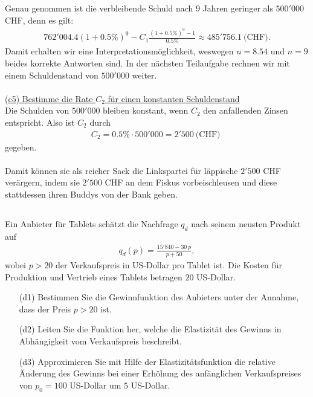 Genau genommen ist die verbleibende Schuld nach $ 9 $ Jahren geringer als $ 500'000 $ CHF, denn es gilt:
\begin{align*}
	762'004.4 (1+ 0.5 \%)^9 - C_1 \frac{(1+ 0.5 \%)^{9}  - 1}{0.5 \%}
	\approx 485'756.1 \ \textrm{(CHF)}.
\end{align*}
Damit erhalten wir eine Interpretationsmöglichkeit, weswegen $ n = 8.54 $ und $ n  = 9 $ beides korrekte Antworten sind. In der nächsten Teilaufgabe rechnen wir mit einem Schuldenstand von $ 500'000 $ weiter.\\
\\
\underline{(c5) Bestimme die Rate $ C_2 $ für einen konstanten Schuldenstand}\\
Die Schulden von $ 500'000 $ bleiben konstant, wenn $ C_2 $ den anfallenden Zinsen entspricht. Also ist $ C_2 $ durch 
\begin{align*}
	C_2=  0.5 \% \cdot 500'000 = 2'500 \ \textrm{(CHF) }
\end{align*}
gegeben.\\
\\
Damit können sie als reicher Sack die Linkspartei für läppische $ 2'500 $ CHF verärgern, indem sie $ 2'500 $ CHF an dem Fiskus vorbeischleusen und diese stattdessen ihren Buddys von der Bank geben.
\newpage 

\subsection*{}
Ein Anbieter für Tablets schätzt die Nachfrage $ q_d $ nach seinem neusten Produkt auf
\begin{align*}
	q_d(p)
	=
	\frac{15'840 - 30 \ p}{p + 50},
\end{align*}
wobei $ p > 20  $ der Verkaufspreis in US-Dollar pro Tablet ist.
Die Kosten für Produktion und Vertrieb eines Tablets betragen $ 20  $ US-Dollar.
\begin{enumerate}
	\item[(d1)]
	Bestimmen Sie die Gewinnfunktion des Anbieters unter der Annahme, dass der Preis $ p > 20 $ ist.
	\item[(d2)]
	Leiten Sie die Funktion her, welche die Elastizität des Gewinns in Abhängigkeit vom Verkaufspreis beschreibt.
	\item[(d3)]
	Approximieren Sie mit Hilfe der Elastizitätsfunktion die relative Änderung des Gewinns bei einer Erhöhung des anfänglichen Verkaufspreises von $ p_0 = 100 $ US-Dollar um $ 5 $ US-Dollar.
\end{enumerate}

